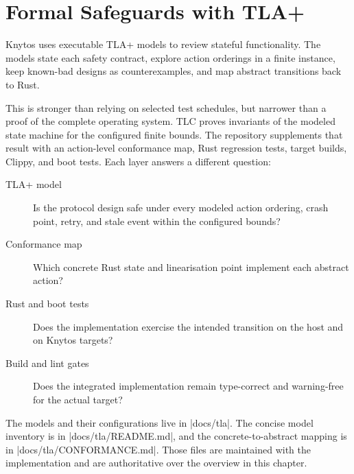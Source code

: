 \chapter{Formal Safeguards with TLA+}
\label{chap:formal-safeguards}
\newcommand{\tlbreak}[2]{\texttt{#1}\allowbreak\texttt{#2}}

Knytos uses executable TLA+ models to review stateful functionality. The
models state each safety contract, explore action orderings in a finite instance,
keep known-bad designs as counterexamples, and map abstract transitions back to
Rust.

This is stronger than relying on selected test schedules, but narrower than a
proof of the complete operating system. TLC proves invariants of the modeled
state machine for the configured finite bounds. The repository supplements
that result with an action-level conformance map, Rust regression tests,
target builds, Clippy, and boot tests. Each layer answers a different question:

\begin{description}
    \item[TLA+ model] Is the protocol design safe under every modeled action
        ordering, crash point, retry, and stale event within the configured
        bounds?
    \item[Conformance map] Which concrete Rust state and linearisation point
        implement each abstract action?
    \item[Rust and boot tests] Does the implementation exercise the intended
        transition on the host and on Knytos targets?
    \item[Build and lint gates] Does the integrated implementation remain
        type-correct and warning-free for the actual target?
\end{description}

The models and their configurations live in \repodir|docs/tla|. The concise
model inventory is in \repofile|docs/tla/README.md|, and the concrete-to-abstract
mapping is in \repofile|docs/tla/CONFORMANCE.md|. Those files are maintained
with the implementation and are authoritative over the overview in this
chapter.

